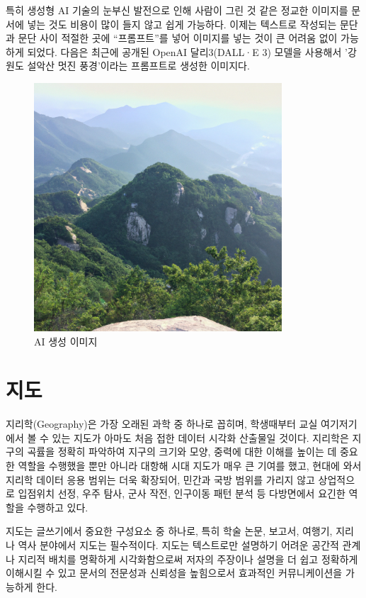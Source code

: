 \documentclass[
  letterpaper,
]{book}
\begin{document}
특히 생성형 AI 기술의 눈부신 발전으로 인해 사람이 그린 것 같은 정교한
이미지를 문서에 넣는 것도 비용이 많이 들지 않고 쉽게 가능하다. 이제는
텍스트로 작성되는 문단과 문단 사이 적절한 곳에 ``프롬프트''를 넣어
이미지를 넣는 것이 큰 어려움 없이 가능하게 되었다. 다음은 최근에 공개된
OpenAI 달리3(DALL·E 3) 모델을 사용해서 '강원도 설악산 멋진 풍경'이라는
프롬프트로 생성한 이미지다.

\begin{figure}

{\centering \includegraphics[width=3.64583in,height=\textheight]{images/dalle_mountain.png}

}

\caption{AI 생성 이미지}

\end{figure}

\hypertarget{uxc9c0uxb3c4}{%
\section{지도}\label{uxc9c0uxb3c4}}

지리학(Geography)은 가장 오래된 과학 중 하나로 꼽히며, 학생때부터 교실
여기저기에서 볼 수 있는 지도가 아마도 처음 접한 데이터 시각화 산출물일
것이다. 지리학은 지구의 곡률을 정확히 파악하여 지구의 크기와 모양,
중력에 대한 이해를 높이는 데 중요한 역할을 수행했을 뿐만 아니라 대항해
시대 지도가 매우 큰 기여를 했고, 현대에 와서 지리학 데이터 응용 범위는
더욱 확장되어, 민간과 국방 범위를 가리지 않고 상업적으로 입점위치 선정,
우주 탐사, 군사 작전, 인구이동 패턴 분석 등 다방면에서 요긴한 역할을
수행하고 있다.

지도는 글쓰기에서 중요한 구성요소 중 하나로, 특히 학술 논문, 보고서,
여행기, 지리나 역사 분야에서 지도는 필수적이다. 지도는 텍스트로만
설명하기 어려운 공간적 관계나 지리적 배치를 명확하게 시각화함으로써
저자의 주장이나 설명을 더 쉽고 정확하게 이해시킬 수 있고 문서의 전문성과
신뢰성을 높힘으로서 효과적인 커뮤니케이션을 가능하게 한다.
\end{document}
